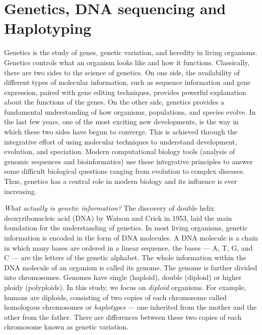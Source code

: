 \section{Genetics, DNA sequencing and Haplotyping}
Genetics is the study of genes, genetic variation, and heredity in living organisms. 
Genetics controls what an organism looks like and how it functions.
Classically, there are two sides to the science of genetics.
On one side, the availability of different types of molecular information, such as sequence information and gene expression, paired with gene editing techniques, 
provides powerful explanation about the functions of the genes.
On the other side, genetics provides a fundamental understanding of how organisms, populations, and species evolve. 
In the last few years, one of the most exciting new developments, is the way in which these two sides have begun to converge.
This is achieved through the integrative effort of using molecular techniques to understand development, evolution, and speciation.
Modern computational biology tools (analysis of genomic sequences and bioinformatics) use these integrative principles 
to answer some difficult biological questions ranging from evolution to complex diseases.
Thus, genetics has a central role in modern biology and its influence is ever increasing.

\textit{What actually is genetic information?} 
The discovery of double helix deoxyribonucleic acid (DNA) by Watson and Crick in 1953, laid the main foundation for the understanding of genetics.
In most living organisms, genetic information is encoded in the form of DNA molecules.
A DNA molecule is a chain in which many bases are ordered in a linear sequence, the bases --- A, T, G, and C --- are the letters of the genetic alphabet.
The whole information within the DNA molecule of an organism is called its genome. The genome is further divided into chromosomes.
Genomes have single (haploid), double (diploid) or higher ploidy (polyploids). 
In this study, we focus on \textit{diploid} organisms. For example, humans are diploids, consisting of two copies of each chromosome called homologous chromosomes or \textit{haplotypes} --- one inherited from the mother and the other from the father.
There are differences between these two copies of each chromosome known as genetic variation. 


